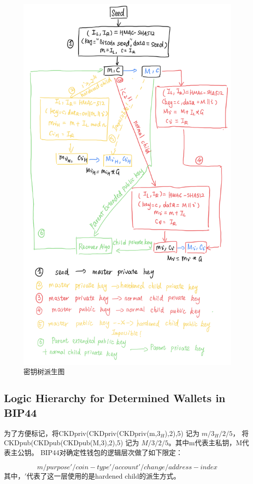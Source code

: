 \begin{figure}[h]
\centering
\includegraphics[width=.7\textwidth]{./outline.png}
\caption{密钥树派生图}\label{fig-parsesig}
\end{figure}

\subsection{Logic Hierarchy for Determined Wallets in BIP44}

为了方便标记，将CKDpriv(CKDpriv(CKDpriv(m,$3_H$),2),5) 记为 $m/3_H/2/5$，
将CKDpub(CKDpub(CKDpub(M,3),2),5) 记为 $M/3/2/5$。其中m代表主私钥，M代表主公钥。
BIP44对确定性钱包的逻辑层次做了如下限定：

$$m / purpose' / coin-type' / account' / change / address-index$$
其中，$'$代表了这一层使用的是hardened child的派生方式。

